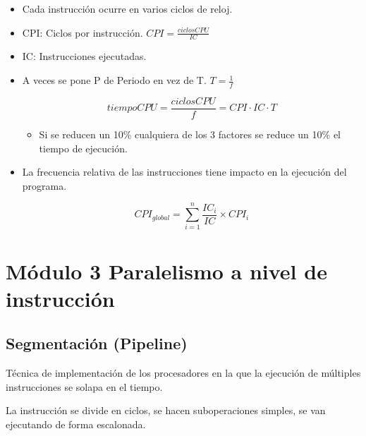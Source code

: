 \documentclass[12pt, twoside, openright]{report} %
\begin{document}
\begin{itemize}

	\item Cada instrucción ocurre en varios ciclos de reloj.
	\item CPI: Ciclos por instrucción. \(CPI = \frac {ciclosCPU} {IC}\)
	\item IC: Instrucciones ejecutadas.
	\item A veces se pone P de Periodo en vez de T. $T=\frac 1f$

	      $$tiempoCPU = \frac {ciclosCPU} f= CPI\cdot IC\cdot T$$



	      \begin{itemize}

		      \item Si se reducen un 10\% cualquiera de los 3 factores se reduce un
		            10\% el tiempo de ejecución.
	      \end{itemize}
	\item La frecuencia relativa de las instrucciones tiene impacto en la
	      ejecución del programa.




	      $$CPI_{global}=\sum_{i=1}^{n} \frac {IC_i} {IC} \times CPI_i$$

\end{itemize}

\chapter{Módulo 3 Paralelismo a nivel de instrucción}



\section{Segmentación (Pipeline)}

Técnica de implementación de los procesadores en la que la ejecución
de múltiples instrucciones se solapa en el tiempo.

La instrucción se divide en ciclos, se hacen suboperaciones simples,
se van ejecutando de forma escalonada.
\end{document}
